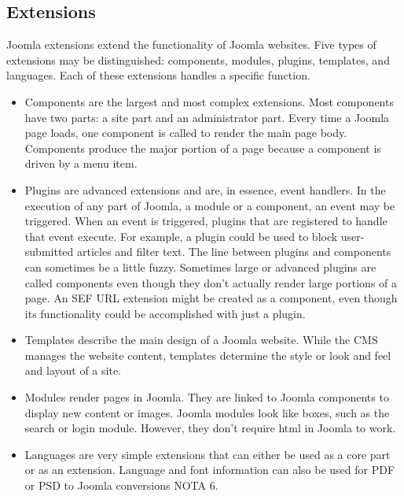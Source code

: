 \subsection{Extensions}
\label{subsec:joomla_ext}
Joomla extensions extend the functionality of Joomla websites. Five types of extensions may be distinguished: components, modules, plugins, templates, and languages. Each of these extensions handles a specific function.
\begin{itemize}
	\item Components are the largest and most complex extensions. Most components have two parts: a site part and an administrator part. Every time a Joomla page loads, one component is called to render the main page body. Components produce the major portion of a page because a component is driven by a menu item.
	\item Plugins are advanced extensions and are, in essence, event handlers. In the execution of any part of Joomla, a module or a component, an event may be triggered. When an event is triggered, plugins that are registered to handle that event execute. For example, a plugin could be used to block user-submitted articles and filter text. The line between plugins and components can sometimes be a little fuzzy. Sometimes large or advanced plugins are called components even though they don't actually render large portions of a page. An SEF URL extension might be created as a component, even though its functionality could be accomplished with just a plugin.
	\item Templates describe the main design of a Joomla website. While the CMS manages the website content, templates determine the style or look and feel and layout of a site.
	\item Modules render pages in Joomla. They are linked to Joomla components to display new content or images. Joomla modules look like boxes, such as the search or login module. However, they don’t require html in Joomla to work.
	\item Languages are very simple extensions that can either be used as a core part or as an extension. Language and font information can also be used for PDF or PSD to Joomla conversions NOTA 6. 
\end{itemize}
